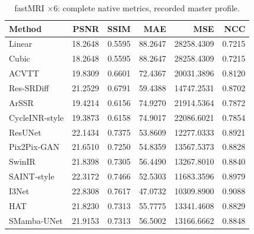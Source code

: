 \begin{table}[t]\centering\small
\caption{fastMRI $\times6$: complete native metrics, recorded master profile.}
\begin{tabular}{lrrrrr}\toprule Method&PSNR&SSIM&MAE&MSE&NCC\\\midrule
Linear & 18.2648 & 0.5595 & 88.2647 & 28258.4309 & 0.7215\\
Cubic & 18.2648 & 0.5595 & 88.2647 & 28258.4309 & 0.7215\\
ACVTT & 19.8309 & 0.6601 & 72.4367 & 20031.3896 & 0.8120\\
Res-SRDiff & 21.2529 & 0.6791 & 59.4388 & 14747.2531 & 0.8702\\
ArSSR & 19.4214 & 0.6156 & 74.9270 & 21914.5364 & 0.7872\\
CycleINR-style & 19.3873 & 0.6158 & 74.9017 & 22086.6021 & 0.7854\\
ResUNet & 22.1434 & 0.7375 & 53.8609 & 12277.0333 & 0.8921\\
Pix2Pix-GAN & 21.6510 & 0.7250 & 54.8359 & 13567.5373 & 0.8828\\
SwinIR & 21.8398 & 0.7305 & 56.4490 & 13267.8010 & 0.8840\\
SAINT-style & 22.3172 & 0.7466 & 52.5303 & 11683.3596 & 0.8979\\
I3Net & 22.8308 & 0.7617 & 47.0732 & 10309.8900 & 0.9088\\
HAT & 21.8230 & 0.7313 & 55.7775 & 13341.4608 & 0.8829\\
SMamba-UNet & 21.9153 & 0.7313 & 56.5002 & 13166.6662 & 0.8848\\
\bottomrule\end{tabular}\end{table}
